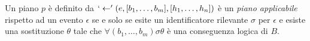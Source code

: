 \smallskip
\begin{defn}
Un piano $p$ è definito da $`\leftarrow'(e, [b_1, \ldots, b_m], [h_1, \ldots, h_n])$ è un \textit{piano applicabile} rispetto ad un evento $\epsilon$ se e solo se esite un identificatore rilevante $\sigma$ per $\epsilon$ e esiste una sostituzione $\theta$ tale che $\forall (b_1, \ldots, b_m) \sigma\theta$ è una conseguenza logica di $B$.
\end{defn}

%
%
%
%
%

